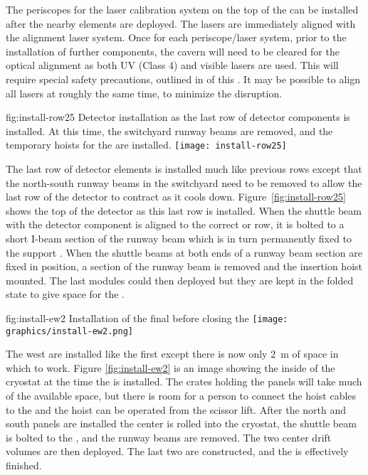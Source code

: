 The periscopes for the laser calibration system on the top of the   can be installed after the nearby  elements are deployed. The lasers are immediately aligned with the alignment laser system. 
Once for each periscope/laser system, prior to the installation of further  components, the cavern will need to be cleared for the optical alignment as both UV (Class 4) and visible lasers are used.  
This will require special safety precautions, outlined in \tcchesh %
of this .
It may be possible to align all lasers at roughly the same time, to minimize the disruption.



\begin{dunefigure}{fig:install-row25}
  {Detector installation as the last row of detector components is installed. At this time, the switchyard runway beams are removed, and the temporary hoists for the  are installed.}
\texttt{[image: install-row25]}
\end{dunefigure}


The last row of detector elements is installed much like previous rows except that the north-south runway beams in the switchyard need to be removed to allow the last row of the detector to contract as it cools down.  Figure~\ref{fig:install-row25} shows the top of the detector as this last row is installed. When the shuttle beam with the detector component is aligned to the correct  or  row, it is bolted to a short I-beam section of the runway beam which is in turn permanently fixed to the  support \fdth . When the shuttle beams at both ends of a runway beam section are fixed in position, a section of the runway beam is removed and the  insertion hoist mounted. The last  modules could then deployed but they are kept in the folded state to give space for the . 



\begin{dunefigure}{fig:install-ew2}
  {Installation of the final  before closing the }
\texttt{[image: graphics/install-ew2.png]}
\end{dunefigure}

The west  are installed like the first  except there is now only \SI{2}{m} of space in which to work. Figure \ref{fig:install-ew2} is an image showing the inside of the cryostat at the time the  is installed. The crates holding the  panels will take much of the available space, but there is room for a person to connect the hoist cables to the  and the hoist can be operated from the scissor lift. After the north and south  panels are installed the center  is rolled into the cryostat, the shuttle beam is bolted to the , and the runway beams are removed. The two center drift volumes  are then deployed. The last two  are constructed, and the  is effectively finished. 

